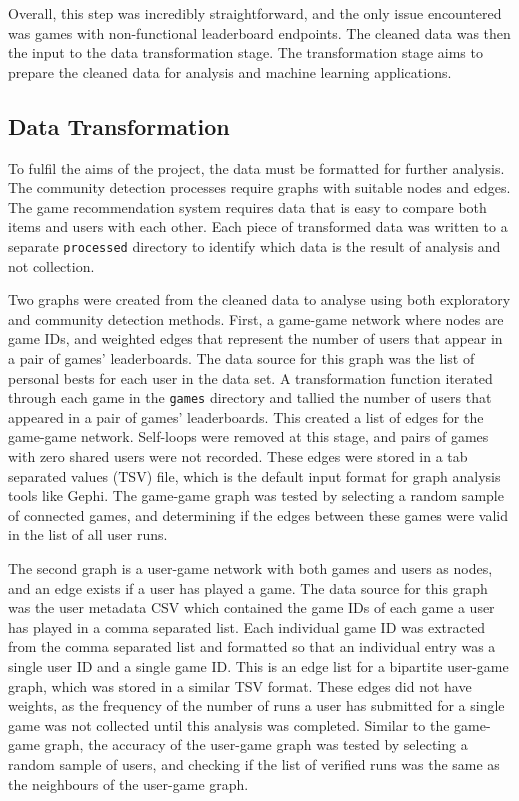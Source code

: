Overall, this step was incredibly straightforward, and the only issue encountered was games with non-functional leaderboard endpoints. The cleaned data was then the input to the data transformation stage. The transformation stage aims to prepare the cleaned data for analysis and machine learning applications.

\subsection{Data Transformation}

To fulfil the aims of the project, the data must be formatted for further analysis. The community detection processes require graphs with suitable nodes and edges. The game recommendation system requires data that is easy to compare both items and users with each other. Each piece of transformed data was written to a separate \texttt{processed} directory to identify which data is the result of analysis and not collection.


Two graphs were created from the cleaned data to analyse using both exploratory and community detection methods. First, a game-game network where nodes are game IDs, and weighted edges that represent the number of users that appear in a pair of games' leaderboards. The data source for this graph was the list of personal bests for each user in the data set. A transformation function iterated through each game in the \texttt{games} directory and tallied the number of users that appeared in a pair of games' leaderboards. This created a list of edges for the game-game network. Self-loops were removed at this stage, and pairs of games with zero shared users were not recorded. These edges were stored in a tab separated values (TSV) file, which is the default input format for graph analysis tools like Gephi. The game-game graph was tested by selecting a random sample of connected games, and determining if the edges between these games were valid in the list of all user runs.


The second graph is a user-game network with both games and users as nodes, and an edge exists if a user has played a game. The data source for this graph was the user metadata CSV which contained the game IDs of each game a user has played in a comma separated list. Each individual game ID was extracted from the comma separated list and formatted so that an individual entry was a single user ID and a single game ID. This is an edge list for a bipartite user-game graph, which was stored in a similar TSV format. These edges did not have weights, as the frequency of the number of runs a user has submitted for a single game was not collected until this analysis was completed. Similar to the game-game graph, the accuracy of the user-game graph was tested by selecting a random sample of users, and checking if the list of verified runs was the same as the neighbours of the user-game graph. 


